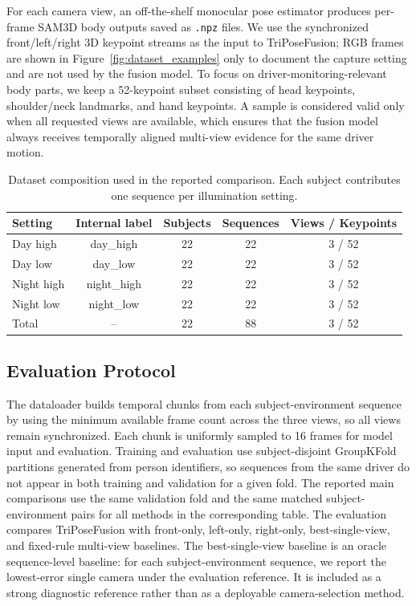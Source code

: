 \documentclass[runningheads]{llncs}
\begin{document}
For each camera view, an off-the-shelf monocular pose estimator produces per-frame SAM3D body outputs saved as \texttt{.npz} files. We use the synchronized front/left/right 3D keypoint streams as the input to TriPoseFusion; RGB frames are shown in Figure~\ref{fig:dataset_examples} only to document the capture setting and are not used by the fusion model. To focus on driver-monitoring-relevant body parts, we keep a 52-keypoint subset consisting of head keypoints, shoulder/neck landmarks, and hand keypoints. A sample is considered valid only when all requested views are available, which ensures that the fusion model always receives temporally aligned multi-view evidence for the same driver motion.

\begin{table}[t]
\centering
\caption{Dataset composition used in the reported comparison. Each subject contributes one sequence per illumination setting.}
\label{tab:dataset_stats}
\scriptsize
\setlength{\tabcolsep}{4pt}
\begin{tabular}{lcccc}
\hline
Setting & Internal label & Subjects & Sequences & Views / Keypoints \\
\hline
Day high & day\_high & 22 & 22 & 3 / 52 \\
Day low & day\_low & 22 & 22 & 3 / 52 \\
Night high & night\_high & 22 & 22 & 3 / 52 \\
Night low & night\_low & 22 & 22 & 3 / 52 \\
\hline
Total & -- & 22 & 88 & 3 / 52 \\
\hline
\end{tabular}
\end{table}

\subsection{Evaluation Protocol}
The dataloader builds temporal chunks from each subject-environment sequence by using the minimum available frame count across the three views, so all views remain synchronized. Each chunk is uniformly sampled to 16 frames for model input and evaluation. Training and evaluation use subject-disjoint GroupKFold partitions generated from person identifiers, so sequences from the same driver do not appear in both training and validation for a given fold. The reported main comparisons use the same validation fold and the same matched subject-environment pairs for all methods in the corresponding table. The evaluation compares TriPoseFusion with front-only, left-only, right-only, best-single-view, and fixed-rule multi-view baselines. The best-single-view baseline is an oracle sequence-level baseline: for each subject-environment sequence, we report the lowest-error single camera under the evaluation reference. It is included as a strong diagnostic reference rather than as a deployable camera-selection method.
\end{document}
